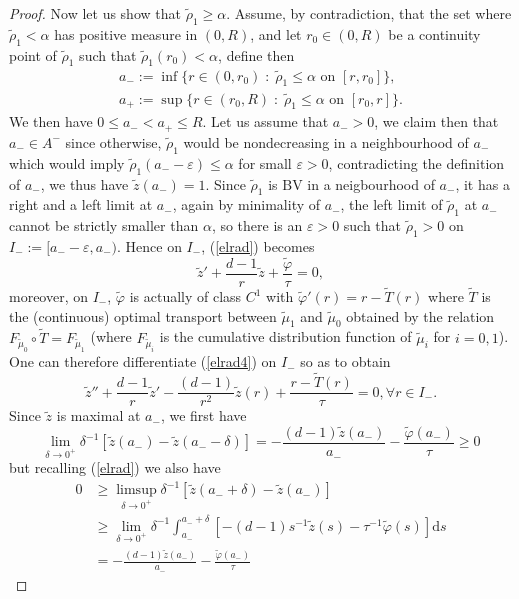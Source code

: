 \documentclass[12pt, a4paper]{article}
\numberwithin{equation}{section}
\theoremstyle{plain}
\theoremstyle{definition}
\theoremstyle{remark}
\newcommand\eps{\varepsilon}
\newcommand\tilm{{\widetilde{\mu}}}
\newcommand\tilr{{\widetilde{\rho}}}
\newcommand\tilfi{{\widetilde{\varphi}}}
\newcommand\tilz{{\widetilde{z}}}
\newcommand\tilT{{\widetilde{T}}}
\newcommand{\BV}{\mathrm{BV}}
\newcommand\pref[1]{(\ref{#1})}
\begin{document}
\begin{proof}
\smallskip

Now let us show that $\tilr_1\ge \alpha$.  Assume, by contradiction, that the set where $\tilr_1<\alpha$ has positive measure in $(0,R)$, and let $r_0\in (0,R)$ be a continuity point of $\tilr_1$ such that $\tilr_1(r_0)<\alpha$, define then 
\[\begin{split}
a_-:= \inf\{ r\in (0, r_0) \; : \; \tilr_1 \le \alpha \mbox{ on $[r, r_0]$}\},\\
 a_+:=  \sup\{ r\in (r_0, R) \; : \; \tilr_1 \le \alpha \mbox{ on $[r_0, r]$}\}.
 \end{split}
 \]
We then have $0\le a_-<a_+ \le R$. Let us assume that  $a_->0$, we claim then that $a_-\in A^{-}$ since otherwise, $\tilr_1$ would be nondecreasing in a neighbourhood of $a_-$ which would imply $\tilr_1(a_--\eps)\le \alpha$ for small $\eps>0$, contradicting the definition of $a_-$, we thus have $\tilz(a_-)=1$. Since $\tilr_1$ is $\BV$ in a neigbourhood of $a_-$, it has a right and a left limit at $a_-$, again by minimality of $a_-$, the left limit of $\tilr_1$ at $a_-$ cannot be strictly smaller than $\alpha$, so there is an $\eps>0$ such that $\tilr_1>0$ on $I_-:=[a_- -\eps, a_-)$. Hence on $I_-$, \pref{elrad} becomes
\begin{equation}\label{elrad4}
\tilz '+\frac{d-1}{r} \tilz + \frac{\tilfi}{\tau}=0, 
\end{equation}
moreover, on $I_-$, $\tilfi$ is actually of class $C^1$ with $\tilfi'(r)=r-\tilT(r)$ where  $\tilT$ is the  (continuous) optimal transport between $\tilm_1$ and $\tilm_0$  obtained by the relation $F_{\tilm_0} \circ \tilT=F_{\tilm_1}$ (where $F_{\tilm_i}$ is the cumulative distribution function of $\tilm_i$ for $i=0, 1$). One can therefore differentiate \pref{elrad4} on $I_-$ so as to obtain
\begin{equation}\label{elrad5}
\tilz''+\frac{d-1}{r} \tilz '-\frac{(d-1)}{r^2} \tilz(r) + \frac{r-\tilT(r)}{\tau}=0, \forall r\in I_-.
\end{equation}
Since $\tilz$ is maximal at $a_-$, we first have
\[\lim_{\delta\to 0^+} \delta^{-1} [\tilz(a_-)  -\tilz(a_-  -\delta)]= -\frac{(d-1)\tilz(a_-)}{a_-}-\frac{\tilfi(a_-)}{\tau} \ge 0\]
but recalling \pref{elrad} we also have 
\[\begin{split}
0 &\ge \limsup_{\delta\to 0^+} \delta^{-1} [\tilz(a_-+\delta)-\tilz(a_-)]\\
&\ge   \lim_{\delta\to 0^+}  \delta^{-1} \int_{a_-}^{a_-+\delta} [-(d-1) s^{-1} \tilz(s)-\tau^{-1} \tilfi(s)] \mbox{d}s \\
&= -\frac{(d-1)\tilz(a_-)}{a_-}-\frac{\tilfi(a_-)}{\tau}

\end{split}\]
\end{proof}
\end{document}
